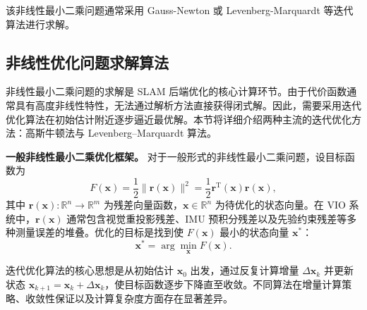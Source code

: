 该非线性最小二乘问题通常采用 Gauss-Newton 或 Levenberg-Marquardt 等迭代算法进行求解。

\subsection{非线性优化问题求解算法}

非线性最小二乘问题的求解是 SLAM 后端优化的核心计算环节。由于代价函数通常具有高度非线性特性，无法通过解析方法直接获得闭式解。因此，需要采用迭代优化算法在初始估计附近逐步逼近最优解。本节将详细介绍两种主流的迭代优化方法：高斯牛顿法与 Levenberg--Marquardt 算法。

\textbf{一般非线性最小二乘优化框架。}
对于一般形式的非线性最小二乘问题，设目标函数为
\begin{equation}
F(\mathbf{x}) = \frac{1}{2}\|\mathbf{r}(\mathbf{x})\|^2 = \frac{1}{2}\mathbf{r}^{\mathrm{T}}(\mathbf{x})\mathbf{r}(\mathbf{x}),
\end{equation}
其中 $\mathbf{r}(\mathbf{x}):\mathbb{R}^n\to\mathbb{R}^m$ 为残差向量函数，$\mathbf{x}\in\mathbb{R}^n$ 为待优化的状态向量。在 VIO 系统中，$\mathbf{r}(\mathbf{x})$ 通常包含视觉重投影残差、IMU 预积分残差以及先验约束残差等多种测量误差的堆叠。优化的目标是找到使 $F(\mathbf{x})$ 最小的状态向量 $\mathbf{x}^*$：
\begin{equation}
\mathbf{x}^* = \arg\min_{\mathbf{x}} F(\mathbf{x}).
\end{equation}

迭代优化算法的核心思想是从初始估计 $\mathbf{x}_0$ 出发，通过反复计算增量 $\Delta\mathbf{x}_k$ 并更新状态 $\mathbf{x}_{k+1}=\mathbf{x}_k+\Delta\mathbf{x}_k$，使目标函数逐步下降直至收敛。不同算法在增量计算策略、收敛性保证以及计算复杂度方面存在显著差异。

